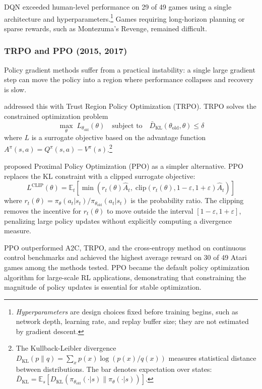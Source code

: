 DQN exceeded human-level performance on 29 of 49 games using a single architecture and hyperparameters.\footnote{\emph{Hyperparameters} are design choices fixed before training begins, such as network depth, learning rate, and replay buffer size; they are not estimated by gradient descent.} Games requiring long-horizon planning or sparse rewards, such as Montezuma's Revenge, remained difficult.

\subsubsection{TRPO and PPO (2015, 2017)}

Policy gradient methods suffer from a practical instability: a single large gradient step can move the policy into a region where performance collapses and recovery is slow.

\citet{Schulman2015} addressed this with Trust Region Policy Optimization (TRPO). TRPO solves the constrained optimization problem
\begin{equation}
\max_\theta \; L_{\theta_{\text{old}}}(\theta) \quad \text{subject to} \quad \bar{D}_{\mathrm{KL}}(\theta_{\text{old}}, \theta) \leq \delta
\end{equation}
where $L$ is a surrogate objective based on the advantage function $A^\pi(s,a) = Q^\pi(s,a) - V^\pi(s)$.\footnote{The Kullback-Leibler divergence $D_{\mathrm{KL}}(p \| q) = \sum_x p(x) \log(p(x)/q(x))$ measures statistical distance between distributions. The bar denotes expectation over states: $\bar{D}_{\mathrm{KL}} = \mathbb{E}_{s}[D_{\mathrm{KL}}(\pi_{\theta_{\text{old}}}(\cdot|s) \| \pi_\theta(\cdot|s))]$.}

\citet{Schulman2017} proposed Proximal Policy Optimization (PPO) as a simpler alternative. PPO replaces the KL constraint with a clipped surrogate objective:
\begin{equation}
L^{\text{CLIP}}(\theta) = \mathbb{E}_t \left[ \min\!\left( r_t(\theta) \hat{A}_t, \; \text{clip}(r_t(\theta), 1-\varepsilon, 1+\varepsilon) \hat{A}_t \right) \right]
\end{equation}
where $r_t(\theta) = \pi_\theta(a_t|s_t) / \pi_{\theta_{\text{old}}}(a_t|s_t)$ is the probability ratio. The clipping removes the incentive for $r_t(\theta)$ to move outside the interval $[1-\varepsilon, 1+\varepsilon]$, penalizing large policy updates without explicitly computing a divergence measure.

PPO outperformed A2C, TRPO, and the cross-entropy method on continuous control benchmarks and achieved the highest average reward on 30 of 49 Atari games among the methods tested. PPO became the default policy optimization algorithm for large-scale RL applications, demonstrating that constraining the magnitude of policy updates is essential for stable optimization.

